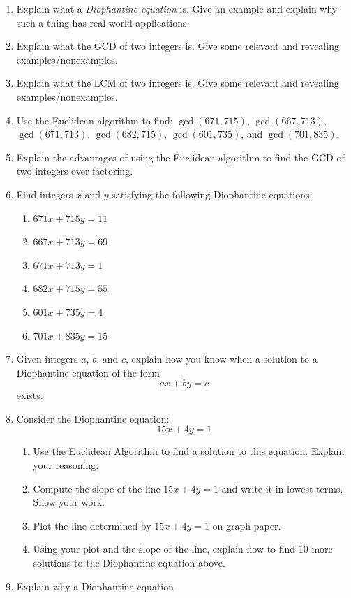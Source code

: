 \begin{problems}

\begin{enumerate}
\item Explain what a \textit{Diophantine equation} is. Give an example
  and explain why such a thing has real-world applications.
\item Explain what the GCD of two integers is. Give some relevant and
  revealing examples/nonexamples.
\item Explain what the LCM of two integers is. Give some relevant and
  revealing examples/nonexamples.
\item Use the Euclidean algorithm to find: $\gcd(671,715)$,
  $\gcd(667,713)$, $\gcd(671,713)$, $\gcd(682,715)$, $\gcd(601,735)$,
  and $\gcd(701,835)$.
\item Explain the advantages of using the Euclidean algorithm to find
  the GCD of two integers over factoring.
\item Find integers $x$ and $y$ satisfying the following Diophantine
  equations:
\begin{enumerate}
\item $671x + 715 y = 11$ 
\item $667x + 713 y = 69$ 
\item $671x + 713 y = 1$
\item $682x + 715 y = 55$
\item $601x + 735 y = 4$
\item $701x + 835 y = 15$
\end{enumerate}
\item Given integers $a$, $b$, and $c$, explain how you know when a
  solution to a Diophantine equation of the form
\[
ax + by = c
\]
exists.
\item Consider the Diophantine equation:
\[
15x + 4y = 1
\]
\begin{enumerate}
\item Use the Euclidean Algorithm to find a solution to this
  equation. Explain your reasoning.
\item Compute the slope of the line $15x + 4y = 1$ and write it in
  lowest terms. Show your work.
\item Plot the line determined by $15x + 4y = 1$ on graph paper.
\item Using your plot and the slope of the line, explain how to find
  $10$ more solutions to the Diophantine equation above.
\end{enumerate}
\item Explain why a Diophantine equation 

\end{enumerate}
\end{problems}
